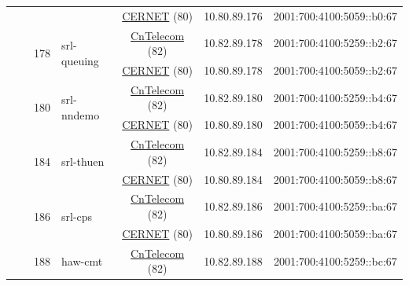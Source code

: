 \begin{small}
\begin{center}
\begin{longtable}{|c|c|c|c|c|c|c|c|}
  &  &  &  & \multicolumn{2}{|c|}{\tiny{\href{http://www.cernet.edu.cn}{CERNET} (80)}} & \tiny{10.80.89.176} & \tiny{2001:700:4100:5059::b0:67} \\* \cline{3-3}\cline{4-4}\cline{5-5}\cline{6-6}\cline{7-7}\cline{8-8}
  &  & \multirow{2}{*}{\tiny{178}} & \multicolumn{1}{|l|}{\multirow{2}{*}{\tiny{srl-queuing}}} & \multicolumn{2}{|c|}{\tiny{\href{http://www.chinatelecom.com.cn}{CnTelecom} (82)}} & \tiny{10.82.89.178} & \tiny{2001:700:4100:5259::b2:67} \\* \cline{5-5}\cline{6-6}\cline{7-7}\cline{8-8}
  &  &  &  & \multicolumn{2}{|c|}{\tiny{\href{http://www.cernet.edu.cn}{CERNET} (80)}} & \tiny{10.80.89.178} & \tiny{2001:700:4100:5059::b2:67} \\* \cline{3-3}\cline{4-4}\cline{5-5}\cline{6-6}\cline{7-7}\cline{8-8}
  &  & \multirow{2}{*}{\tiny{180}} & \multicolumn{1}{|l|}{\multirow{2}{*}{\tiny{srl-nndemo}}} & \multicolumn{2}{|c|}{\tiny{\href{http://www.chinatelecom.com.cn}{CnTelecom} (82)}} & \tiny{10.82.89.180} & \tiny{2001:700:4100:5259::b4:67} \\* \cline{5-5}\cline{6-6}\cline{7-7}\cline{8-8}
  &  &  &  & \multicolumn{2}{|c|}{\tiny{\href{http://www.cernet.edu.cn}{CERNET} (80)}} & \tiny{10.80.89.180} & \tiny{2001:700:4100:5059::b4:67} \\* \cline{3-3}\cline{4-4}\cline{5-5}\cline{6-6}\cline{7-7}\cline{8-8}
  &  & \multirow{2}{*}{\tiny{184}} & \multicolumn{1}{|l|}{\multirow{2}{*}{\tiny{srl-thuen}}} & \multicolumn{2}{|c|}{\tiny{\href{http://www.chinatelecom.com.cn}{CnTelecom} (82)}} & \tiny{10.82.89.184} & \tiny{2001:700:4100:5259::b8:67} \\* \cline{5-5}\cline{6-6}\cline{7-7}\cline{8-8}
  &  &  &  & \multicolumn{2}{|c|}{\tiny{\href{http://www.cernet.edu.cn}{CERNET} (80)}} & \tiny{10.80.89.184} & \tiny{2001:700:4100:5059::b8:67} \\* \cline{3-3}\cline{4-4}\cline{5-5}\cline{6-6}\cline{7-7}\cline{8-8}
  &  & \multirow{2}{*}{\tiny{186}} & \multicolumn{1}{|l|}{\multirow{2}{*}{\tiny{srl-cps}}} & \multicolumn{2}{|c|}{\tiny{\href{http://www.chinatelecom.com.cn}{CnTelecom} (82)}} & \tiny{10.82.89.186} & \tiny{2001:700:4100:5259::ba:67} \\* \cline{5-5}\cline{6-6}\cline{7-7}\cline{8-8}
  &  &  &  & \multicolumn{2}{|c|}{\tiny{\href{http://www.cernet.edu.cn}{CERNET} (80)}} & \tiny{10.80.89.186} & \tiny{2001:700:4100:5059::ba:67} \\* \cline{3-3}\cline{4-4}\cline{5-5}\cline{6-6}\cline{7-7}\cline{8-8}
  &  & \multirow{2}{*}{\tiny{188}} & \multicolumn{1}{|l|}{\multirow{2}{*}{\tiny{haw-cmt}}} & \multicolumn{2}{|c|}{\tiny{\href{http://www.chinatelecom.com.cn}{CnTelecom} (82)}} & \tiny{10.82.89.188} & \tiny{2001:700:4100:5259::bc:67} \\* \cline{5-5}\cline{6-6}\cline{7-7}\cline{8-8}

\end{longtable}
\end{center}
\end{small}
